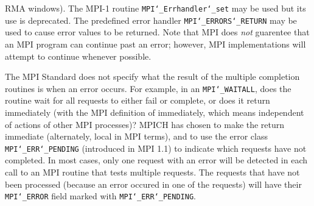 RMA windows).  The MPI-1 routine {\tt MPI{\tt \char`\_}Errhandler{\tt \char`\_}set} may be used but
its use is deprecated.  The predefined error handler
{\tt MPI{\tt \char`\_}ERRORS{\tt \char`\_}RETURN} may be used to cause error values to be returned.
Note that MPI does {\em not} guarentee that an MPI program can continue past
an error; however, MPI implementations will attempt to continue whenever
possible.
\par
{}
The MPI Standard does not specify what the result of the multiple
completion routines is when an error occurs.  For example, in an
{\tt MPI{\tt \char`\_}WAITALL}, does the routine wait for all requests to either fail or
complete, or does it return immediately (with the MPI definition of
immediately, which means independent of actions of other MPI processes)?
MPICH has chosen to make the return immediate (alternately, local in MPI
terms), and to use the error class {\tt MPI{\tt \char`\_}ERR{\tt \char`\_}PENDING} (introduced in MPI 1.1)
to indicate which requests have not completed.  In most cases, only
one request with an error will be detected in each call to an MPI routine
that tests multiple requests.  The requests that have not been processed
(because an error occured in one of the requests) will have their
{\tt MPI{\tt \char`\_}ERROR} field marked with {\tt MPI{\tt \char`\_}ERR{\tt \char`\_}PENDING}.
\endmanpage
